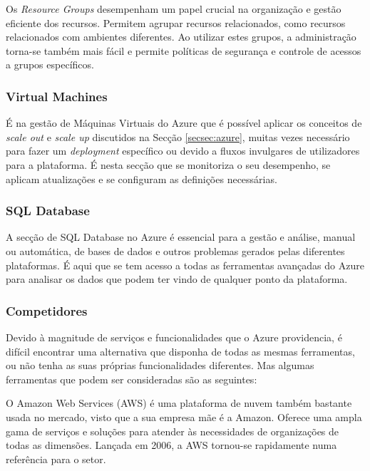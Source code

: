             Os \textit{Resource Groups} desempenham um papel crucial na organização e gestão eficiente dos recursos. Permitem agrupar recursos relacionados, como recursos relacionados com ambientes diferentes. Ao utilizar estes grupos, a administração torna-se também mais fácil e permite políticas de segurança e controle de acessos a grupos específicos. 

        \subsubsection{Virtual Machines}

            É na gestão de Máquinas Virtuais do Azure que é possível aplicar os conceitos de \textit{scale out} e \textit{scale up} discutidos na Secção \ref{secsec:azure}, muitas vezes necessário para fazer um \textit{deployment} específico ou devido a fluxos invulgares de utilizadores para a plataforma. É nesta secção que se monitoriza o seu desempenho, se aplicam atualizações e se configuram as definições necessárias.

        \subsubsection{SQL Database} %

            A secção de SQL Database no Azure é essencial para a gestão e análise, manual ou automática, de bases de dados e outros problemas gerados pelas diferentes plataformas. É aqui que se tem acesso a todas as ferramentas avançadas do Azure para analisar os dados que podem ter vindo de qualquer ponto da plataforma.

        \subsubsection{Competidores}\label{competidores-azure}

            Devido à magnitude de serviços e funcionalidades que o Azure providencia, é difícil encontrar uma alternativa que disponha de todas as mesmas ferramentas, ou não tenha as suas próprias funcionalidades diferentes. Mas algumas ferramentas que podem ser consideradas são as seguintes:

            \label{competidores-aws}

                O Amazon Web Services (AWS) é uma plataforma de nuvem também bastante usada no mercado, visto que a sua empresa mãe é a Amazon. Oferece uma ampla gama de serviços e soluções para atender às necessidades de organizações de todas as dimensões. Lançada em 2006, a AWS tornou-se rapidamente numa referência para o setor.

